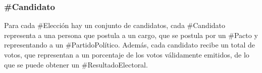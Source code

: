 \subsubsection{\#Candidato}

Para cada \#Elección hay un conjunto de candidatos, cada \#Candidato
representa a una persona que postula a un cargo, que se postula por un
\#Pacto y representando a un \#PartidoPolítico. Además, cada candidato
recibe un total de votos, que representan a un porcentaje de los votos
válidamente emitidos, de lo que se puede obtener un
\#ResultadoElectoral.

\begin{description}
  
\end{description}